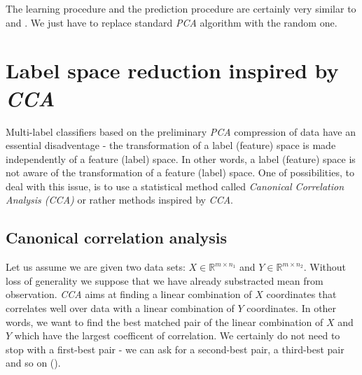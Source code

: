 The learning procedure and the prediction procedure are certainly very similar to  and . We just have to replace standard \textit{PCA} algorithm with the random one.

\section{Label space reduction inspired by \textit{CCA}}

Multi-label classifiers based on the preliminary \textit{PCA} compression of data have an essential disadventage - the transformation of a label (feature) space is made independently of a feature (label) space. In other words, a label (feature) space is not aware of the transformation of a feature (label) space. One of possibilities, to deal with this issue, is to use a statistical method called \textit{Canonical Correlation Analysis (\textit{CCA})} or rather methods inspired by \textit{CCA}.   

\subsection{Canonical correlation analysis}

Let us assume we are given two data sets: $X \in \mathbb{R}^{m \times n_1}$ and $Y \in \mathbb{R}^{m \times n_2}$. Without loss of generality we suppose that we have already substracted mean from observation. \textit{CCA} aims at finding a linear combination of $X$ coordinates that correlates well over data with a linear combination of $Y$ coordinates. In other words, we want to find the best matched pair of the linear combination of $X$ and $Y$ which have the largest coefficent of correlation. We certainly do not need to stop with a first-best pair - we can ask for a second-best pair, a third-best pair and so on (\cite{William}).

